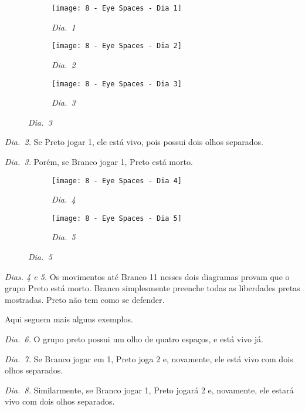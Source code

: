\begin{figure}[h!]
    \centering
    \begin{subfigure}[t]{.31\textwidth}
        \texttt{[image: 8 - Eye Spaces - Dia 1]}
        \caption*{\emph{Dia.\@~1}}
    \end{subfigure}
    \hfill
    \begin{subfigure}[t]{.31\textwidth}
        \texttt{[image: 8 - Eye Spaces - Dia 2]}
        \caption*{\emph{Dia.\@~2}}
    \end{subfigure}
    \hfill
    \begin{subfigure}[t]{.31\textwidth}
        \texttt{[image: 8 - Eye Spaces - Dia 3]}
        \caption*{\emph{Dia.\@~3}}
    \end{subfigure}
\end{figure}

\emph{Dia.\@~2.} Se Preto jogar 1, ele está vivo, pois possui dois olhos separados.

\emph{Dia.\@~3.} Porém, se Branco jogar 1, Preto está morto.

\begin{figure}[h!]
    \centering
    \begin{subfigure}[t]{.31\textwidth}
        \texttt{[image: 8 - Eye Spaces - Dia 4]}
        \caption*{\emph{Dia.\@~4}}
    \end{subfigure}
    \hspace{1cm}
    \begin{subfigure}[t]{.31\textwidth}
        \texttt{[image: 8 - Eye Spaces - Dia 5]}
        \caption*{\emph{Dia.\@~5}}
    \end{subfigure}
\end{figure}

\emph{Dias. 4 e 5.} Os movimentos até Branco 11 nesses dois diagramas provam que o grupo Preto está morto. Branco simplesmente preenche todas as liberdades pretas mostradas. Preto não tem como se defender.

Aqui seguem mais alguns exemplos.

\emph{Dia.\@~6.} O grupo preto possui um olho de quatro espaços, e está vivo já.

\emph{Dia.\@~7.} Se Branco jogar em 1, Preto joga 2 e, novamente, ele está vivo com dois olhos separados.

\emph{Dia.\@~8.} Similarmente, se Branco jogar 1, Preto jogará 2 e, novamente, ele estará vivo com dois olhos separados.

